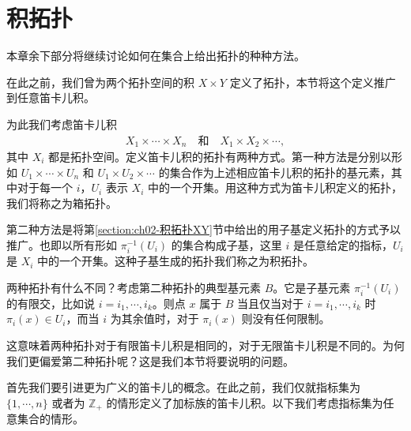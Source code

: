\documentclass[../../main.tex]{subfiles}
\begin{document}
\section{积拓扑}\label{section:ch02-积拓扑}

本章余下部分将继续讨论如何在集合上给出拓扑的种种方法。

在此之前，我们曾为两个拓扑空间的积 $X \times Y$ 定义了拓扑，本节将这个定义推广到任意笛卡儿积。

为此我们考虑笛卡儿积
\begin{align*}
X_{1} \times \cdots \times X_{n} \quad \text{和} \quad X_{1} \times X_{2} \times \cdots,
\end{align*}
其中 $X_{i}$ 都是拓扑空间。定义笛卡儿积的拓扑有两种方式。第一种方法是分别以形如 $U_{1} \times \cdots \times U_{n}$ 和 $U_{1} \times U_{2} \times \cdots$ 的集合作为上述相应笛卡儿积的拓扑的基元素，其中对于每一个 $i$，$U_{i}$ 表示 $X_{i}$ 中的一个开集。用这种方式为笛卡儿积定义的拓扑，我们将称之为箱拓扑。

第二种方法是将第\cref{section:ch02-积拓扑XY}节中给出的用子基定义拓扑的方式予以推广。也即以所有形如 $\pi_{i}^{-1}(U_{i})$ 的集合构成子基，这里 $i$ 是任意给定的指标，$U_{i}$ 是 $X_{i}$ 中的一个开集。这种子基生成的拓扑我们称之为积拓扑。

两种拓扑有什么不同？考虑第二种拓扑的典型基元素 $B$。它是子基元素 $\pi_{i}^{-1}(U_{i})$ 的有限交，比如说 $i = i_{1}, \cdots, i_{k}$。则点 $x$ 属于 $B$ 当且仅当对于 $i = i_{1}, \cdots, i_{k}$ 时 $\pi_{i}(x) \in U_{i}$，而当 $i$ 为其余值时，对于 $\pi_{i}(x)$ 则没有任何限制。

这意味着两种拓扑对于有限笛卡儿积是相同的，对于无限笛卡儿积是不同的。为何我们更偏爱第二种拓扑呢？这是我们本节将要说明的问题。

首先我们要引进更为广义的笛卡儿的概念。在此之前，我们仅就指标集为 $\{1, \cdots, n\}$ 或者为 $\mathbb{Z}_{+}$ 的情形定义了加标族的笛卡儿积。以下我们考虑指标集为任意集合的情形。
\end{document}
